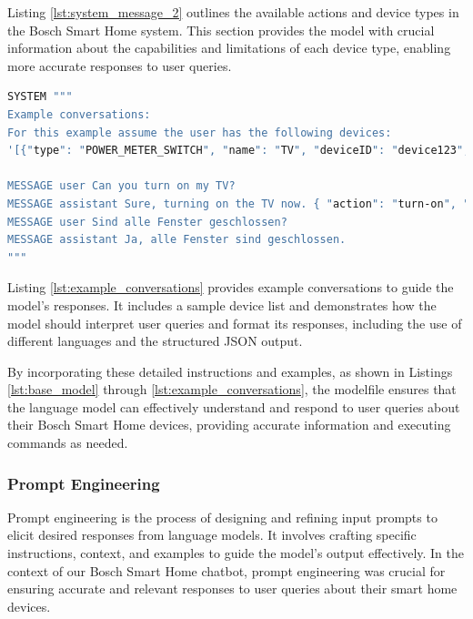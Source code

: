 Listing \ref{lst:system_message_2} outlines the available actions and device types in the Bosch Smart Home system. This section provides the model with crucial information about the capabilities and limitations of each device type, enabling more accurate responses to user queries.

\begin{Listing}
\begin{lstlisting}[language=bash]
SYSTEM """
Example conversations:
For this example assume the user has the following devices:
'[{"type": "POWER_METER_SWITCH", "name": "TV", "deviceID": "device123", "state": [{"id": "PowerSwitch", "state": {"switchState": "OFF"}}], "room": "Schlafzimmer"}, {"type": "SHUTTER_CONTACT", "name": "WindowSensor-67890", "deviceID": "device456", "state": [{"id": "ShutterContact", "state": {"value": "CLOSED"}}], "room": "Wohnzimmer"}]'

MESSAGE user Can you turn on my TV?
MESSAGE assistant Sure, turning on the TV now. { "action": "turn-on", "deviceID": "device123", "device": "POWER_METER_SWITCH", "room": "Schlafzimmer", "name": "TV" }
MESSAGE user Sind alle Fenster geschlossen?
MESSAGE assistant Ja, alle Fenster sind geschlossen.
"""
\end{lstlisting}
\caption{Example Conversations and Device List}
\label{lst:example_conversations}
\end{Listing}

Listing \ref{lst:example_conversations} provides example conversations to guide the model's responses. It includes a sample device list and demonstrates how the model should interpret user queries and format its responses, including the use of different languages and the structured JSON output.

By incorporating these detailed instructions and examples, as shown in Listings \ref{lst:base_model} through \ref{lst:example_conversations}, the modelfile ensures that the language model can effectively understand and respond to user queries about their Bosch Smart Home devices, providing accurate information and executing commands as needed.


\subsubsection{Prompt Engineering}

Prompt engineering is the process of designing and refining input prompts to elicit desired responses from language models. It involves crafting specific instructions, context, and examples to guide the model's output effectively. In the context of our Bosch Smart Home chatbot, prompt engineering was crucial for ensuring accurate and relevant responses to user queries about their smart home devices.

